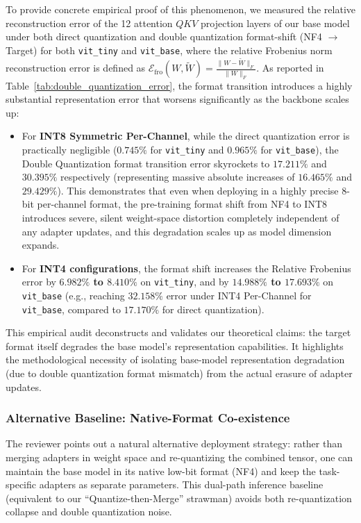 To provide concrete empirical proof of this phenomenon, we measured the relative reconstruction error of the 12 attention $QKV$ projection layers of our base model under both direct quantization and double quantization format-shift (NF4 $\to$ Target) for both \texttt{vit\_tiny} and \texttt{vit\_base}, where the relative Frobenius norm reconstruction error is defined as $\mathcal{E}_{\text{fro}}(W, \tilde{W}) = \frac{\|W - \tilde{W}\|_F}{\|W\|_F}$. As reported in Table~\ref{tab:double_quantization_error}, the format transition introduces a highly substantial representation error that worsens significantly as the backbone scales up:
\begin{itemize}
  \item For \textbf{INT8 Symmetric Per-Channel}, while the direct quantization error is practically negligible ($0.745\%$ for \texttt{vit\_tiny} and $0.965\%$ for \texttt{vit\_base}), the Double Quantization format transition error skyrockets to \textbf{$17.211\%$} and \textbf{$30.395\%$} respectively (representing massive absolute increases of \textbf{$16.465\%$} and \textbf{$29.429\%$}). This demonstrates that even when deploying in a highly precise 8-bit per-channel format, the pre-training format shift from NF4 to INT8 introduces severe, silent weight-space distortion completely independent of any adapter updates, and this degradation scales up as model dimension expands.
  \item For \textbf{INT4 configurations}, the format shift increases the Relative Frobenius error by \textbf{$6.982\%$ to $8.410\%$} on \texttt{vit\_tiny}, and by \textbf{$14.988\%$ to $17.693\%$} on \texttt{vit\_base} (e.g., reaching \textbf{$32.158\%$} error under INT4 Per-Channel for \texttt{vit\_base}, compared to $17.170\%$ for direct quantization).
\end{itemize}
This empirical audit deconstructs and validates our theoretical claims: the target format itself degrades the base model's representation capabilities. It highlights the methodological necessity of isolating base-model representation degradation (due to double quantization format mismatch) from the actual erasure of adapter updates.

\subsubsection{Alternative Baseline: Native-Format Co-existence}
The reviewer points out a natural alternative deployment strategy: rather than merging adapters in weight space and re-quantizing the combined tensor, one can maintain the base model in its native low-bit format (NF4) and keep the task-specific adapters as separate parameters. This dual-path inference baseline (equivalent to our ``Quantize-then-Merge'' strawman) avoids both re-quantization collapse and double quantization noise. 

